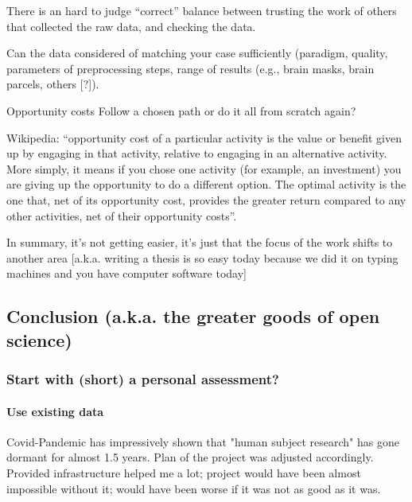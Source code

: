 %
There is an hard to judge ``correct'' balance between trusting the work of
others that collected the raw data, and checking the data.

Can the data considered of matching your case sufficiently (paradigm, quality,
parameters of preprocessing steps, range of results (e.g., brain masks, brain
parcels, others [?]).

%
Opportunity costs
%
Follow a chosen path or do it all from scratch again?

Wikipedia: ``opportunity cost of a particular activity is the value or benefit
given up by engaging in that activity, relative to engaging in an alternative
activity.
%
More simply, it means if you chose one activity (for example, an investment) you
are giving up the opportunity to do a different option.
%
The optimal activity is the one that, net of its opportunity cost, provides the
greater return compared to any other activities, net of their opportunity
costs''.

%
In summary, it's not getting easier, it's just that the focus of the work shifts
to another area [a.k.a. writing a thesis is so easy today because we did it on
typing machines and you have computer software today]



\subsection{Conclusion (a.k.a. the greater goods of open science)}




\subsubsection{Start with (short) a personal assessment?}



\paragraph{Use existing data}
%
Covid-Pandemic has impressively shown that "human subject research" has gone
dormant for almost 1.5 years.
%
Plan of the project was adjusted accordingly.
%
Provided infrastructure helped me a lot; project would have been almost
impossible without it; would have been worse if it was not as good as it was.


